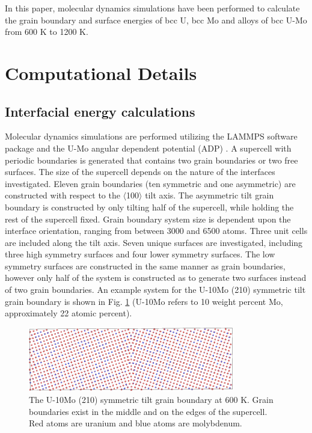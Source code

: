 \documentclass[review]{elsarticle}
\begin{document}
In this paper, molecular dynamics simulations have been performed to calculate the grain boundary and surface energies of bcc U, bcc Mo and alloys of bcc U-Mo from 600 K to 1200 K. 

\section{Computational Details}
\subsection{Interfacial energy calculations}
Molecular dynamics simulations are performed utilizing the LAMMPS \cite{plimpton1995} software package and the U-Mo angular dependent potential (ADP) \cite{smirnovaADP}. A supercell with periodic boundaries is generated that contains two grain boundaries or two free surfaces. The size of the supercell depends on the nature of the interfaces investigated. Eleven grain boundaries (ten symmetric and one asymmetric) are constructed with respect to the $\langle$100$\rangle$ tilt axis. The asymmetric tilt grain boundary is constructed by only tilting half of the supercell, while holding the rest of the supercell fixed. Grain boundary system size is dependent upon the interface orientation, ranging from between 3000 and 6500 atoms. Three unit cells are included along the tilt axis. Seven unique surfaces are investigated, including three high symmetry surfaces and four lower symmetry surfaces. The low symmetry surfaces are constructed in the same manner as grain boundaries, however only half of the system is constructed as to generate two surfaces instead of two grain boundaries. An example system for the U-10Mo (210) symmetric tilt grain boundary is shown in Fig. \ref{fig:gbex} (U-10Mo refers to 10 weight percent Mo, approximately 22 atomic percent).

\begin{figure}[h]
 \centering
 \includegraphics[width=0.8\textwidth]{gbex.png} 
 \caption{The U-10Mo (210) symmetric tilt grain boundary at 600 K. Grain boundaries exist in the middle and on the edges of the supercell. Red atoms are uranium and blue atoms are molybdenum.}
 \label{fig:gbex}
\end{figure}
\end{document}

